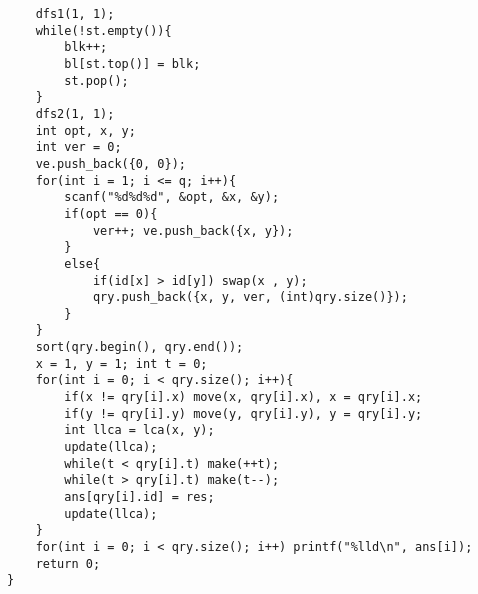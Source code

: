 \begin{lstlisting}
    dfs1(1, 1);
    while(!st.empty()){
        blk++;
        bl[st.top()] = blk;
        st.pop();
    }
    dfs2(1, 1);
    int opt, x, y;
    int ver = 0;
    ve.push_back({0, 0});
    for(int i = 1; i <= q; i++){
        scanf("%d%d%d", &opt, &x, &y);
        if(opt == 0){
            ver++; ve.push_back({x, y});
        }
        else{
            if(id[x] > id[y]) swap(x , y);
            qry.push_back({x, y, ver, (int)qry.size()});
        }
    }
    sort(qry.begin(), qry.end());
    x = 1, y = 1; int t = 0;
    for(int i = 0; i < qry.size(); i++){
        if(x != qry[i].x) move(x, qry[i].x), x = qry[i].x;
        if(y != qry[i].y) move(y, qry[i].y), y = qry[i].y;
        int llca = lca(x, y);
        update(llca);
        while(t < qry[i].t) make(++t);
        while(t > qry[i].t) make(t--);
        ans[qry[i].id] = res;
        update(llca);
    }
    for(int i = 0; i < qry.size(); i++) printf("%lld\n", ans[i]);
    return 0;
}\end{lstlisting}